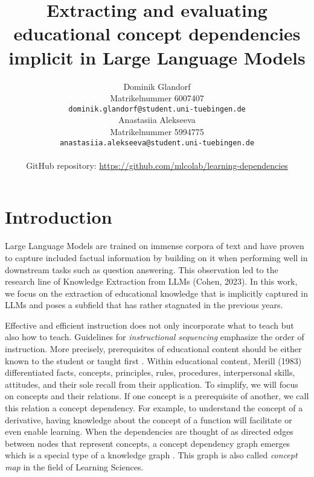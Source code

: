 \documentclass{article}
\title{Extracting and evaluating educational concept dependencies implicit in Large Language Models}
\author{%
  Dominik Glandorf\\
  Matrikelnummer 6007407\\
  \texttt{dominik.glandorf@student.uni-tuebingen.de} \\
  \And
  Anastasiia Alekseeva\\
  Matrikelnummer 5994775\\
  \texttt{anastasiia.alekseeva@student.uni-tuebingen.de} \\
  \\
  GitHub repository: \url{https://github.com/mlcolab/learning-dependencies}
}
\begin{document}
\vspace*{-5mm}
\maketitle
\vspace*{-5mm}

\begin{abstract}





\end{abstract}

\section{Introduction}
Large Language Models are trained on immense corpora of text and have proven to capture included factual information by building on it when performing well in downstream tasks such as question answering. This observation led to the research line of Knowledge Extraction from LLMs (Cohen, 2023). In this work, we focus on the extraction of educational knowledge that is implicitly captured in LLMs and poses a subfield that has rather stagnated in the previous years.

Effective and efficient instruction does not only incorporate what to teach but also how to teach. Guidelines for \textit{instructional sequencing} emphasize the order of instruction. More precisely, prerequisites of educational content should be either known to the student or taught first \citep{morrison2019designing}.
Within educational content, Merill (1983) differentiated facts, concepts, principles, rules, procedures, interpersonal skills, attitudes, and their sole recall from their application. To simplify, we will focus on concepts and their relations. 
If one concept is a prerequisite of another, we call this relation a concept dependency. For example, to understand the concept of a derivative, having knowledge about the concept of a function will facilitate or even enable learning. When the dependencies are thought of as directed edges between nodes that represent concepts, a concept dependency graph emerges which is a special type of a knowledge graph \citep{wang2016using}. This graph is also called \textit{concept map} in the field of Learning Sciences.
\end{document}

